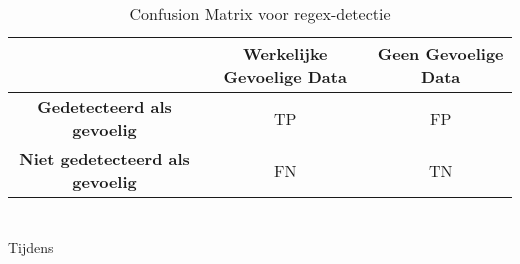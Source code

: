 \subsection{}
\label{sec:correctheid-resultaten-eigen}

\begin{table}[h]
    \centering
    \begin{tabular}{|c|c|c|}
        \hline
        \textbf{} & \textbf{Werkelijke Gevoelige Data} & \textbf{Geen Gevoelige Data} \\ \hline
        \textbf{Gedetecteerd als gevoelig} & TP & FP \\ \hline
        \textbf{Niet gedetecteerd als gevoelig} & FN & TN \\ \hline
    \end{tabular}
    \caption{Confusion Matrix voor regex-detectie}
    \label{tab:confusion_matrix-eigen}
\end{table}

\section{}
\label{sec:performantie-resultaten}


\section{}
\label{sec:gebruiksvriendelijkheid-resultaten}



\section{}
\label{sec:toekomstig-onderzoek}

Tijdens 

